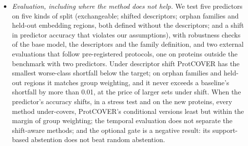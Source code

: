 \begin{itemize}
\item \emph{Evaluation, including where the method does not help.} We test five predictors on five kinds of split (exchangeable; shifted descriptors; orphan families and held-out embedding regions, both defined without the descriptors; and a shift in predictor accuracy that violates our assumptions), with robustness checks of the base model, the descriptors and the family definition, and two external evaluations that follow pre-registered protocols, one on \unsNProt{} proteins outside the benchmark with two predictors. Under descriptor shift ProtCOVER has the smallest worse-class shortfall below the target; on orphan families and held-out regions it matches group weighting, and it never exceeds a baseline's shortfall by more than 0.01, at the price of larger sets under shift. When the predictor's accuracy shifts, in a stress test and on the new proteins, every method under-covers, ProtCOVER's conditional versions least but within the margin of group weighting; the temporal evaluation does not separate the shift-aware methods; and the optional gate is a negative result: its support-based abstention does not beat random abstention.
\end{itemize}
